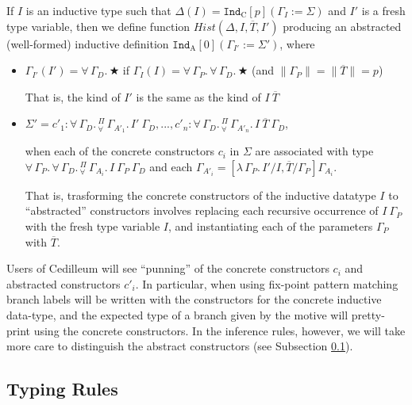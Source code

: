 \documentclass{article}
\newcommand{\ann}[2]{#1\! : \! #2}
\newcommand{\absu}[3]{{#1}\, #2.\, #3}
\newcommand{\indast}[4]{\texttt{Ind}_{#1} [#2] (#3 := #4)}
\newcommand{\lenc}[1]{\|#1\|}
\newcommand{\vars}[1]{{\overline{#1}}}
\newcommand{\piforall}{^{\Pi}_{\forall}}
\begin{document}
If $I$ is an inductive type such that $\Delta(I) =
\indast{\text{C}}{p}{\Gamma_I}{\Sigma}$ and $I'$ is a fresh type variable, then we
define function $Hist(\Delta,I,\vars{T},I')$ producing an abstracted (well-formed)
inductive definition $\indast{\text{A}}{0}{\Gamma_{I'}}{\Sigma'}$, where

\begin{itemize}
\item $\Gamma_{I'}(I') = \absu{\forall}{\Gamma_D}{★}$ if $\Gamma_{I}(I) =
  \absu{\forall}{\Gamma_{P}}{\absu{\forall}{\Gamma_D}{★}}$ (and $\lenc{\Gamma_P}
  = \lenc{\vars{T}} = p$)

  That is, the kind of $I'$ is the same as the kind of $I\ \vars{T}$
\item $\Sigma' = \ann{c'_1}{\absu{\forall}{\Gamma_D}
    { \absu{\piforall}{\Gamma_{A'_1}}{I'\ \Gamma_D} }},...,
  \ann{c'_n}{\absu{\forall}{\Gamma_D}
    { \absu{\piforall}{\Gamma_{A'_n}}{I\ \vars{T}\ \Gamma_D} }}$,

  when each of the concrete constructors $c_i$ in $\Sigma$ are associated with
  type $\absu{\forall}{\Gamma_P}{
    \absu{\forall}{\Gamma_D}{ \absu{\piforall}{\Gamma_{A_i}}{I\ \Gamma_P\
        \Gamma_D} } }$ and each $\Gamma_{A'_i} =
  [\absu{\lambda}{\Gamma_P}{I'}/I,\vars{T}/\Gamma_P]\Gamma_{A_i}$.

  That is, trasforming the concrete constructors of the inductive datatype $I$
  to ``abstracted'' constructors involves replacing each recursive occurrence of
  $I\ \Gamma_P$ with the fresh type variable $I$, and instantiating each of the
  parameters $\Gamma_P$ with $\vars{T}$.
\end{itemize}

Users of Cedilleum will see ``punning'' of the concrete constructors $c_i$ and
abstracted constructors $c'_i$. In particular, when using fix-point pattern
matching branch labels will be written with the constructors for the concrete
inductive data-type, and the expected type of a branch given by the motive will
pretty-print using the concrete constructors. In the inference rules, however,
we will take more care to distinguish the abstract constructors (see Subsection
\ref{ssec:typing-rules}).

\subsection{Typing Rules}
\label{ssec:typing-rules}
\end{document}
